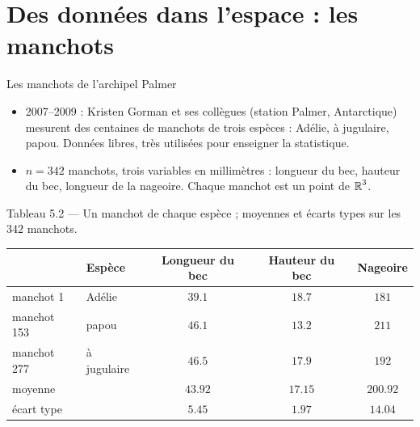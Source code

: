 \section{Des données dans l'espace : les manchots}

\begin{frame}{Les manchots de l'archipel Palmer}
  \small
  \begin{itemize}
    \item 2007--2009 : Kristen Gorman et ses collègues (station Palmer,
      Antarctique) mesurent des centaines de manchots de trois espèces :
      Adélie, à jugulaire, papou. Données libres, très utilisées pour
      enseigner la statistique.
    \item $n=342$ manchots, trois variables en millimètres : longueur du bec,
      hauteur du bec, longueur de la nageoire. Chaque manchot est un point
      de $\operatorname{\mathbb{R}}^3$.
  \end{itemize}
  \vspace{2pt}
  \scriptsize Tableau 5.2 --- Un manchot de chaque espèce ; moyennes et écarts
  types sur les $342$ manchots.
  \begin{center}
    \footnotesize
    \begin{tabular}{llccc}
      \toprule
      & Espèce & Longueur du bec & Hauteur du bec & Nageoire \\
      \midrule
      manchot 1 & Adélie & $\num{39.1}$ & $\num{18.7}$ & $181$ \\
      manchot 153 & papou & $\num{46.1}$ & $\num{13.2}$ & $211$ \\
      manchot 277 & à jugulaire & $\num{46.5}$ & $\num{17.9}$ & $192$ \\
      \midrule
      moyenne & & $\num{43.92}$ & $\num{17.15}$ & $\num{200.92}$ \\
      écart type & & $\num{5.45}$ & $\num{1.97}$ & $\num{14.04}$ \\
      \bottomrule
    \end{tabular}
  \end{center}
\end{frame}

